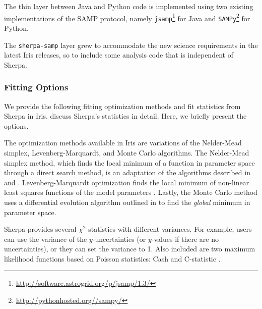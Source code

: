 \documentclass[preprint,authoryear,5p]{elsarticle}
\begin{document}
\begin{sloppypar}
The thin layer between Java and Python code is implemented using two existing
implementations of the SAMP protocol, namely
\verb|jsamp|\footnote{\url{http://software.astrogrid.org/p/jsamp/1.3/}} for Java and
\verb|SAMPy|\footnote{\url{http://pythonhosted.org//sampy/}} for Python.
\end{sloppypar}

The \verb|sherpa-samp| layer grew to accommodate the new science requirements in
the latest Iris releases, so to include some analysis code that is
independent of Sherpa.

\subsubsection{Fitting Options}
\label{sherpa-fitting}

We provide the following fitting optimization methods and fit statistics from Sherpa 
in Iris. \citet{2009pysc.conf...51R} discuss Sherpa's statistics in detail. Here, 
we briefly present the options.

The optimization methods available in Iris are variations of the Nelder-Mead simplex, 
Levenberg-Marquardt, and Monte Carlo algorithms. The Nelder-Mead simplex method, which
finds the local minimum of a function in parameter space through a direct search method, is an
adaptation of the algorithms described in 
\citet{wright1996} and \citet{Lagarias:1998:CPN:588893.589108}. 
Levenberg-Marquardt optimization 
finds the local minimum of non-linear least squares functions of the model parameters
\citep{jjmore1978}. Lastly, the Monte Carlo method uses a differential evolution
algorithm outlined in \citet{Storn:1997:DEN:596061.596146} 
to find the \textit{global} minimum in parameter space.

Sherpa provides several $\chi^{2}$ statistics with different variances. For example, 
users can use the variance of the 
$y$-uncertainties (or $y$-values if there are no uncertainties), 
or they can set the variance to 1.
Also included are two maximum likelihood functions based on Poisson statistics: Cash and 
C-statistic \citep{1979ApJ...228..939C}. 


\end{document}
